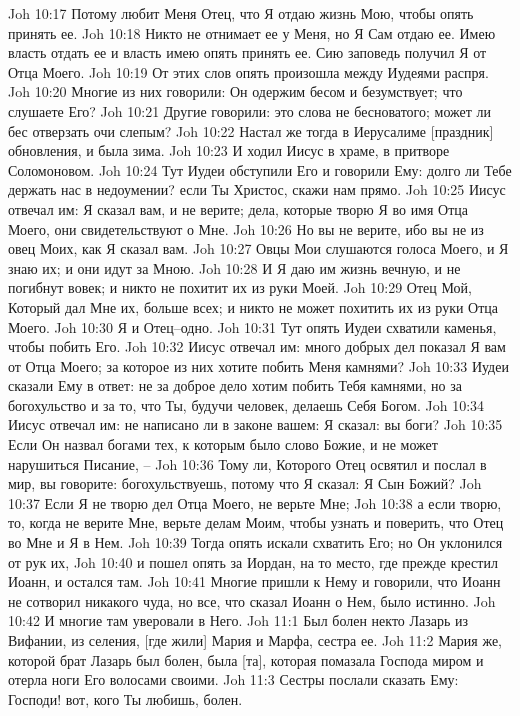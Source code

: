 Joh 10:17  Потому любит Меня Отец, что Я отдаю жизнь Мою, чтобы опять принять ее.
Joh 10:18  Никто не отнимает ее у Меня, но Я Сам отдаю ее. Имею власть отдать ее и власть имею опять принять ее. Сию заповедь получил Я от Отца Моего.
Joh 10:19  От этих слов опять произошла между Иудеями распря.
Joh 10:20  Многие из них говорили: Он одержим бесом и безумствует; что слушаете Его?
Joh 10:21  Другие говорили: это слова не бесноватого; может ли бес отверзать очи слепым?
Joh 10:22  Настал же тогда в Иерусалиме [праздник] обновления, и была зима.
Joh 10:23  И ходил Иисус в храме, в притворе Соломоновом.
Joh 10:24  Тут Иудеи обступили Его и говорили Ему: долго ли Тебе держать нас в недоумении? если Ты Христос, скажи нам прямо.
Joh 10:25  Иисус отвечал им: Я сказал вам, и не верите; дела, которые творю Я во имя Отца Моего, они свидетельствуют о Мне.
Joh 10:26  Но вы не верите, ибо вы не из овец Моих, как Я сказал вам.
Joh 10:27  Овцы Мои слушаются голоса Моего, и Я знаю их; и они идут за Мною.
Joh 10:28  И Я даю им жизнь вечную, и не погибнут вовек; и никто не похитит их из руки Моей.
Joh 10:29  Отец Мой, Который дал Мне их, больше всех; и никто не может похитить их из руки Отца Моего.
Joh 10:30  Я и Отец--одно.
Joh 10:31  Тут опять Иудеи схватили каменья, чтобы побить Его.
Joh 10:32  Иисус отвечал им: много добрых дел показал Я вам от Отца Моего; за которое из них хотите побить Меня камнями?
Joh 10:33  Иудеи сказали Ему в ответ: не за доброе дело хотим побить Тебя камнями, но за богохульство и за то, что Ты, будучи человек, делаешь Себя Богом.
Joh 10:34  Иисус отвечал им: не написано ли в законе вашем: Я сказал: вы боги?
Joh 10:35  Если Он назвал богами тех, к которым было слово Божие, и не может нарушиться Писание, --
Joh 10:36  Тому ли, Которого Отец освятил и послал в мир, вы говорите: богохульствуешь, потому что Я сказал: Я Сын Божий?
Joh 10:37  Если Я не творю дел Отца Моего, не верьте Мне;
Joh 10:38  а если творю, то, когда не верите Мне, верьте делам Моим, чтобы узнать и поверить, что Отец во Мне и Я в Нем.
Joh 10:39  Тогда опять искали схватить Его; но Он уклонился от рук их,
Joh 10:40  и пошел опять за Иордан, на то место, где прежде крестил Иоанн, и остался там.
Joh 10:41  Многие пришли к Нему и говорили, что Иоанн не сотворил никакого чуда, но все, что сказал Иоанн о Нем, было истинно.
Joh 10:42  И многие там уверовали в Него.
Joh 11:1  Был болен некто Лазарь из Вифании, из селения, [где жили] Мария и Марфа, сестра ее.
Joh 11:2  Мария же, которой брат Лазарь был болен, была [та], которая помазала Господа миром и отерла ноги Его волосами своими.
Joh 11:3  Сестры послали сказать Ему: Господи! вот, кого Ты любишь, болен.
